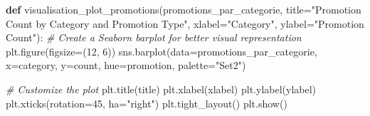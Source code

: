 \documentclass[
]{article}
\newenvironment{Shaded}{}{}
\newcommand{\CommentTok}[1]{\textcolor[rgb]{0.38,0.63,0.69}{\textit{#1}}}
\newcommand{\DecValTok}[1]{\textcolor[rgb]{0.25,0.63,0.44}{#1}}
\newcommand{\KeywordTok}[1]{\textcolor[rgb]{0.00,0.44,0.13}{\textbf{#1}}}
\newcommand{\NormalTok}[1]{#1}
\newcommand{\OperatorTok}[1]{\textcolor[rgb]{0.40,0.40,0.40}{#1}}
\newcommand{\StringTok}[1]{\textcolor[rgb]{0.25,0.44,0.63}{#1}}
\begin{document}
\hypertarget{cda47ad1-94da-458d-b1e4-5f7143c5b9ea}{}
\begin{Shaded}
\begin{Highlighting}[]
\KeywordTok{def}\NormalTok{ visualisation\_plot\_promotions(promotions\_par\_categorie, title}\OperatorTok{=}\StringTok{"Promotion Count by Category and Promotion Type"}\NormalTok{, xlabel}\OperatorTok{=}\StringTok{"Category"}\NormalTok{, ylabel}\OperatorTok{=}\StringTok{"Promotion Count"}\NormalTok{):}
    \CommentTok{\# Create a Seaborn barplot for better visual representation}
\NormalTok{    plt.figure(figsize}\OperatorTok{=}\NormalTok{(}\DecValTok{12}\NormalTok{, }\DecValTok{6}\NormalTok{))}
\NormalTok{    sns.barplot(data}\OperatorTok{=}\NormalTok{promotions\_par\_categorie, }
\NormalTok{        x}\OperatorTok{=}\StringTok{\textquotesingle{}category\textquotesingle{}}\NormalTok{, }
\NormalTok{        y}\OperatorTok{=}\StringTok{\textquotesingle{}count\textquotesingle{}}\NormalTok{, }
\NormalTok{        hue}\OperatorTok{=}\StringTok{\textquotesingle{}promotion\textquotesingle{}}\NormalTok{, }
\NormalTok{        palette}\OperatorTok{=}\StringTok{"Set2"}\NormalTok{)}
    
    \CommentTok{\# Customize the plot}
\NormalTok{    plt.title(title)}
\NormalTok{    plt.xlabel(xlabel)}
\NormalTok{    plt.ylabel(ylabel)}
\NormalTok{    plt.xticks(rotation}\OperatorTok{=}\DecValTok{45}\NormalTok{, ha}\OperatorTok{=}\StringTok{"right"}\NormalTok{)}
\NormalTok{    plt.tight\_layout()}
\NormalTok{    plt.show()}
\end{Highlighting}
\end{Shaded}
\end{document}
